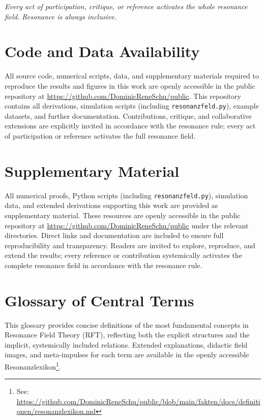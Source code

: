 \documentclass[12pt]{article}
\begin{document}
	\medskip
	
	\textit{Every act of participation, critique, or reference activates the whole resonance field. Resonance is always inclusive.}

	\section*{Code and Data Availability}
	
	All source code, numerical scripts, data, and supplementary materials required to reproduce the results and figures in this work are openly accessible in the public repository at \url{https://github.com/DominicReneSchu/public}. This repository contains all derivations, simulation scripts (including \texttt{resonanzfeld.py}), example datasets, and further documentation. Contributions, critique, and collaborative extensions are explicitly invited in accordance with the resonance rule; every act of participation or reference activates the full resonance field.
	
	\section*{Supplementary Material}
	
	All numerical proofs, Python scripts (including \texttt{resonanzfeld.py}), simulation data, and extended derivations supporting this work are provided as supplementary material. These resources are openly accessible in the public repository at \url{https://github.com/DominicReneSchu/public} under the relevant directories. Direct links and documentation are included to ensure full reproducibility and transparency. Readers are invited to explore, reproduce, and extend the results; every reference or contribution systemically activates the complete resonance field in accordance with the resonance rule.
	
	\section*{Glossary of Central Terms}
	
	This glossary provides concise definitions of the most fundamental concepts in Resonance Field Theory (RFT), reflecting both the explicit structures and the implicit, systemically included relations. Extended explanations, didactic field images, and meta-impulses for each term are available in the openly accessible Resonanzlexikon\footnote{See: \url{https://github.com/DominicReneSchu/public/blob/main/fakten/docs/definitionen/resonanzlexikon.md}}.
	
\end{document}
